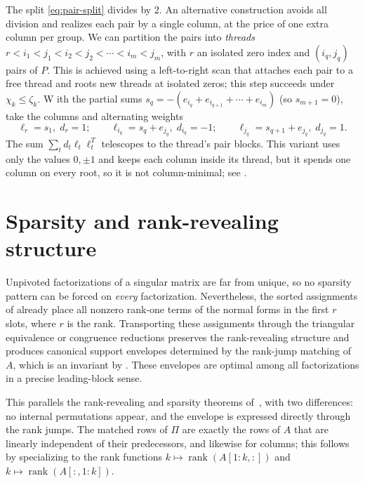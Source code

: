 \documentclass[preprint,12pt]{elsarticle}
\theoremstyle{plain}
\theoremstyle{nonumberplain}
\numberwithin{equation}{section}
\DeclareMathOperator{\rk}{rank}
\numberwithin{theorem}{section}
\begin{document}
\begin{remark}\label{rem:threads}
  The split \cref{eq:pair-split} divides by $2$.  An alternative construction avoids all division and realizes each pair by a single column, at the price of one extra column per group. We can partition the pairs into \emph{threads} $r < i_1 < j_1 < i_2 < j_2 < \cdots < i_m < j_m$, with $r$ an isolated zero index and $(i_q, j_q)$ pairs of $P$. This is achieved using a left-to-right scan that attaches each pair to a free thread and roots new threads at isolated zeros; this step succeeds under $\chi_k \le \zeta_k$. W ith the partial sums $s_q = -(e_{i_q} + e_{i_{q+1}} + \cdots + e_{i_m})$ (so $s_{m+1} = 0$), take the columns and alternating weights
  \[
    \ell_r = s_1, \; d_r = 1;
    \qquad
    \ell_{i_q} = s_q + e_{j_q}, \; d_{i_q} = -1;
    \qquad
    \ell_{j_q} = s_{q+1} + e_{j_q}, \; d_{j_q} = 1 .
  \]
  The sum $\sum_t d_t \ell_t \ell_t^T$ telescopes to the thread's pair blocks.  This variant uses only the values $0, \pm 1$ and keeps each column inside its thread, but it spends one column on every root, so it is not column-minimal; see .
\end{remark}

\section{Sparsity and rank-revealing structure}\label{sec:sparsity}

Unpivoted factorizations of a singular matrix are far from unique, so no sparsity pattern can be forced on \emph{every} factorization. Nevertheless, the sorted assignments of  already place all nonzero rank-one terms of the normal forms in the first $r$ slots, where $r$ is the rank. Transporting these assignments through the triangular equivalence or congruence reductions preserves the rank-revealing structure and produces canonical support envelopes determined by the rank-jump matching of $A$, which is an invariant by . These envelopes are optimal among all factorizations in a precise leading-block sense.

This parallels the rank-revealing and sparsity theorems of~\cite{darve_lu_2026}, with two differences: no internal permutations appear, and the envelope is expressed directly through the rank jumps. The matched rows of $\Pi$ are exactly the rows of $A$ that are linearly independent of their predecessors, and likewise for columns; this follows by specializing  to the rank functions $k\mapsto\rk(A[1:k,:])$ and $k\mapsto\rk(A[:,1:k])$.
\end{document}
